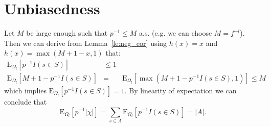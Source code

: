 \documentclass{article}
\newcommand{\expectation}{\mathrm{E}}
\theoremstyle{definition}
\begin{document}
\section{Unbiasedness}
Let $M$ be large enough such that $p^{-1} \leq M$ a.s. (e.g. we can choose $M = f^{-l}$). Then we can derive from Lemma~\ref{le:neg_cor} using $h(x) = x$ and $h(x) = \max(M+1-x,1)$ that:
\begin{eqnarray*}
  \expectation_{\Omega_l} [ p^{-1} I(s \in S) ] & \leq 1 & \\
  \expectation_{\Omega_l} [ M + 1 - p^{-1} I(s \in S) ] & = & \expectation_{\Omega_l} [ \max(M + 1 - p^{-1} I(s \in S),1) ] \leq M  
\end{eqnarray*}
which implies $\expectation_{\Omega_l} [ p^{-1} I(s \in S) ] = 1$.
By linearity of expectation we can conclude that
\[
  \expectation_{\Omega_l} [ p^{-1} |\chi| ] = \sum_{s \in A} \expectation_{\Omega_l} [ p^{-1} I(s \in S) ] = |A| \textrm{.}
\]


 
\end{document}
